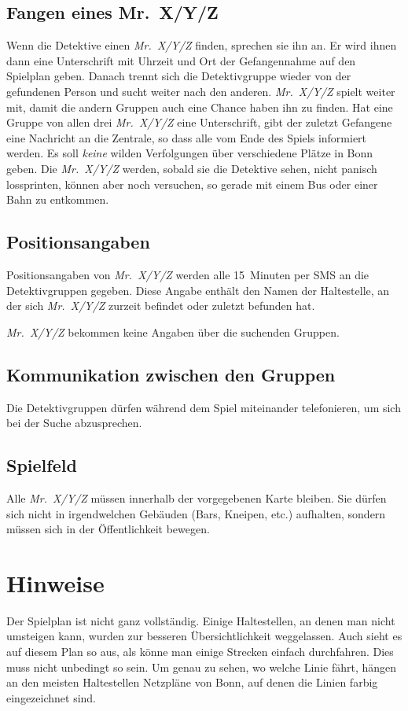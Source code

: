 \subsection*{Fangen eines Mr.~X/Y/Z}
Wenn die Detektive einen \emph{Mr.~X/Y/Z} finden, sprechen sie ihn an. Er wird ihnen
dann eine Unterschrift mit Uhrzeit und Ort der Gefangennahme auf den Spielplan
geben. Danach trennt sich die Detektivgruppe wieder von der gefundenen Person und sucht weiter nach den
anderen. \emph{Mr.~X/Y/Z} spielt weiter mit, damit die andern Gruppen auch eine Chance
haben ihn zu finden. Hat eine Gruppe von allen drei \emph{Mr.~X/Y/Z} eine Unterschrift,
gibt der zuletzt Gefangene eine Nachricht an die Zentrale, so dass alle vom Ende
des Spiels informiert werden.
Es soll \emph{keine} wilden Verfolgungen über verschiedene Plätze in Bonn geben. Die \emph{Mr.~X/Y/Z} werden, sobald sie die Detektive sehen, nicht panisch lossprinten, können aber noch versuchen, so gerade mit einem Bus oder einer Bahn zu entkommen.
\subsection*{Positionsangaben}
Positionsangaben von \emph{Mr.~X/Y/Z} werden alle 15~Minuten per SMS an die
Detektivgruppen gegeben. Diese Angabe enthält den Namen der Haltestelle, an der
sich \emph{Mr.~X/Y/Z} zurzeit befindet oder zuletzt befunden hat.

\emph{Mr.~X/Y/Z} bekommen keine Angaben über die suchenden Gruppen.
\subsection*{Kommunikation zwischen den Gruppen}
Die Detektivgruppen dürfen während dem Spiel miteinander telefonieren, um sich
bei der Suche abzusprechen.
\subsection*{Spielfeld}
Alle \emph{Mr.~X/Y/Z} müssen innerhalb der vorgegebenen Karte bleiben. Sie dürfen sich
nicht in irgendwelchen Gebäuden (Bars, Kneipen, etc.) aufhalten, sondern müssen
sich in der Öffentlichkeit bewegen.
\section*{Hinweise}
Der Spielplan ist nicht ganz vollständig. Einige Haltestellen,
an denen man nicht umsteigen kann, wurden zur besseren Übersichtlichkeit
weggelassen. Auch sieht es auf diesem Plan so aus, als könne man einige Strecken
einfach durchfahren. Dies muss nicht unbedingt so sein. Um genau zu sehen, wo
welche Linie fährt, hängen an den meisten Haltestellen Netzpläne von Bonn, auf
denen die Linien farbig eingezeichnet sind.

